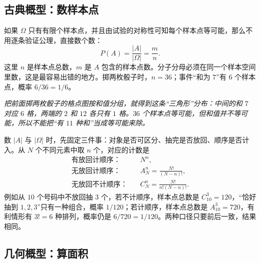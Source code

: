 \subsection{古典概型：数样本点}

如果 $\Omega$ 只有有限个样本点，并且由试验的对称性可知每个样本点等可能，那么不用逐条验证公理，直接数个数：
\[
P(A)=\frac{|A|}{|\Omega|}=\frac{m}{n}.
\]
这里 $n$ 是样本点总数，$m$ 是 $A$ 包含的样本点数。分子分母必须在同一个样本空间里数，这是最容易出错的地方。掷两枚骰子时，$n=36$；事件“和为 $7$”有 $6$ 个样本点，概率 $6/36=1/6$。

\begin{center}
\par\vspace{2pt}
{\footnotesize\itshape 把前面掷两枚骰子的格点图按和值分组，就得到这条“三角形”分布：中间的和 $7$ 对应 $6$ 格，两端的 $2$ 和 $12$ 各只有 $1$ 格。$36$ 个样本点等可能，但和值并不等可能，所以不能把“有 $11$ 种和”当成等可能来除。}
\end{center}

数 $|A|$ 与 $|\Omega|$ 时，先固定三件事：对象是否可区分、抽完是否放回、顺序是否计入。从 $N$ 个不同元素中取 $n$ 个，对应的计数是
\[
\begin{aligned}
\text{有放回计顺序：}\quad & N^n,\\
\text{无放回计顺序：}\quad & A_N^n=\frac{N!}{(N-n)!},\\
\text{无放回不计顺序：}\quad & C_N^n=\frac{N!}{n!(N-n)!}.
\end{aligned}
\]
例如从 $10$ 个号码中不放回抽 $3$ 个，若不计顺序，样本点总数是 $C_{10}^3=120$，“恰好抽到 $1,2,3$”只有一种组合，概率 $1/120$；若计顺序，样本点总数是 $A_{10}^3=720$，有利情形有 $3!=6$ 种排列，概率仍是 $6/720=1/120$。两种口径只要前后一致，结果相同。

\subsection{几何概型：算面积}

